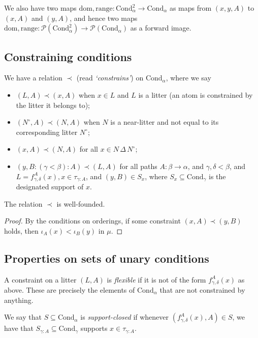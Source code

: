 \documentclass[a4paper]{article}
\begin{document}
We also have two maps \( \mathrm{dom, range} \colon \mathrm{Cond}_\alpha^2 \to \mathrm{Cond}_\alpha \) as maps from \( (x,y,A) \) to \( (x,A) \) and \( (y,A) \), and hence two maps \( \mathrm{dom, range} \colon \mathcal P(\mathrm{Cond}_\alpha^2) \to \mathcal P(\mathrm{Cond}_\alpha) \) as a forward image.

\subsection{Constraining conditions}
We have a relation \( \prec \) (read \textit{`constrains'}) on \( \mathrm{Cond}_\alpha \), where we say
\begin{itemize}
  \item \( (L, A) \prec (x, A) \) when \( x \in L \) and \( L \) is a litter (an atom is constrained by the litter it belongs to);
  \item \( (N^\circ, A) \prec (N, A) \) when \( N \) is a near-litter and not equal to its corresponding litter \( N^\circ \);
  \item \( (x, A) \prec (N, A) \) for all \( x \in N\,\Delta\, N^\circ \);
  \item \( (y, B:(\gamma<\beta):A) \prec (L, A) \) for all paths \( A \colon \beta \to \alpha \), and \( \gamma,\delta < \beta \), and \( L = f^A_{\gamma,\delta}(x), x \in \tau_{\gamma:A} \), and \( (y,B) \in S_x \), where \( S_x \subseteq \mathrm{Cond}_\gamma \) is the designated support of \( x \).
\end{itemize}

\begin{proposition}
  The relation \( \prec \) is well-founded.
\end{proposition}
\begin{proof}
  By the conditions on orderings, if some constraint \( (x, A) \prec (y,B) \) holds, then \( \iota_A(x) < \iota_B(y) \) in \( \mu \).
\end{proof}

\subsection{Properties on sets of unary conditions}
A constraint on a litter \( (L,A) \) is \textit{flexible} if it is not of the form \( f^A_{\gamma,\delta}(x) \) as above.
These are precisely the elements of \( \mathrm{Cond}_\alpha \) that are not constrained by anything.

We say that \( S \subseteq \mathrm{Cond}_\alpha \) is \textit{support-closed} if whenever \( (f^A_{\gamma,\delta}(x),A) \in S \), we have that \( S_{\gamma:A} \subseteq \mathrm{Cond}_\gamma \) supports \( x \in \tau_{\gamma:A} \).
\end{document}
